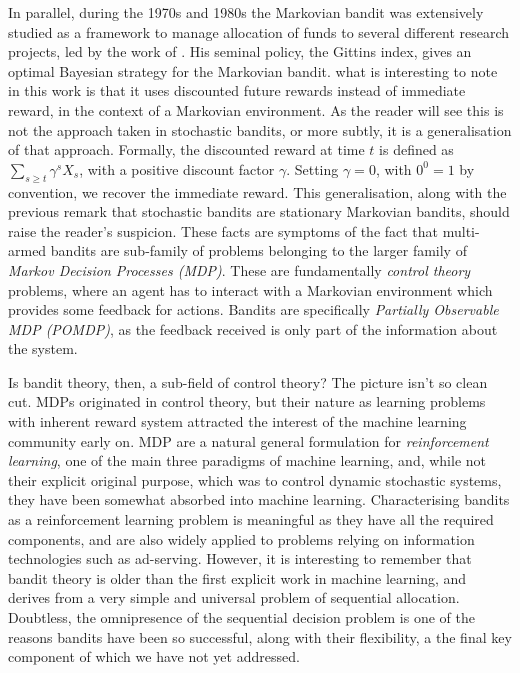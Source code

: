 \par In parallel, during the 1970s and 1980s the Markovian bandit was extensively studied as a framework to manage allocation of funds to several different research projects\cite{gittins:1989}, led by the work of \citeauthor{gittins:1979}. His seminal policy, the Gittins index\cite{gittins:1979},  gives an optimal Bayesian strategy for the Markovian bandit. what is interesting to note in this work is that it uses discounted future rewards instead of immediate reward, in the context of a Markovian environment. As the reader will see this is not the approach taken in stochastic bandits, or more subtly, it is a generalisation of that approach. Formally, the discounted reward at time $t$ is defined as $\sum_{s\geq t}\gamma^sX_s$, with a positive discount factor $\gamma$. Setting $\gamma=0$, with $0^0=1$ by convention, we recover the immediate reward. This generalisation, along with the previous remark that stochastic bandits are stationary Markovian bandits, should raise the reader's suspicion. These facts are symptoms of the fact that multi-armed bandits are sub-family of problems belonging to the larger family of {\em Markov Decision Processes (MDP)}. These are fundamentally {\em control theory} problems, where an agent has to interact with a Markovian environment which provides some feedback for actions. Bandits are specifically {\em Partially Observable MDP (POMDP)}, as the feedback received is only part of the information about the system. 

\par Is bandit theory, then, a sub-field of control theory? The picture isn't so clean cut. MDPs originated in control theory, but their nature as learning problems with inherent reward system attracted the interest of the machine learning community early on. MDP are a natural general formulation\cite{sutton:1998} for {\em reinforcement learning}, one of the main three paradigms of machine learning, and, while not their explicit original purpose, which was to control dynamic stochastic systems, they have been somewhat absorbed into machine learning. Characterising bandits as a reinforcement learning problem is meaningful as they have all the required components, and are also widely applied to problems relying on information technologies such as ad-serving\cite{vernade:2017,dudik:2011}.  However, it is interesting to remember that bandit theory is older than the first explicit work in machine learning\cite{rosenblatt:1958,samuel:1959}, and derives from a very simple and universal problem of sequential allocation. Doubtless, the omnipresence of the sequential decision problem is one of the reasons bandits have been so successful, along with their flexibility, a the final key component of which we have not yet addressed.

